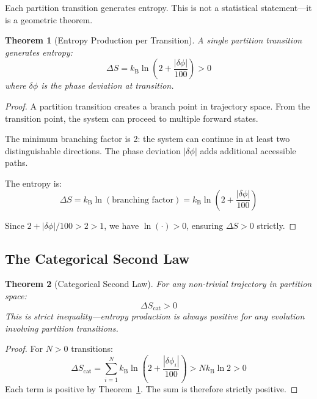 \documentclass[twocolumn,10pt,a4paper]{article}
\newtheorem{theorem}{Theorem}[section]
\theoremstyle{definition}
\theoremstyle{remark}
\newcommand{\kB}{k_{\mathrm{B}}}
\begin{document}
Each partition transition generates entropy. This is not a statistical statement---it is a geometric theorem.

\begin{theorem}[Entropy Production per Transition]
\label{thm:entropy_transition}
A single partition transition generates entropy:
\begin{equation}
    \Delta S = \kB \ln\left(2 + \frac{|\delta\phi|}{100}\right) > 0
\end{equation}
where $\delta\phi$ is the phase deviation at transition.
\end{theorem}

\begin{proof}
A partition transition creates a branch point in trajectory space. From the transition point, the system can proceed to multiple forward states.

The minimum branching factor is 2: the system can continue in at least two distinguishable directions. The phase deviation $|\delta\phi|$ adds additional accessible paths.

The entropy is:
\begin{equation}
    \Delta S = \kB \ln(\text{branching factor}) = \kB \ln\left(2 + \frac{|\delta\phi|}{100}\right)
\end{equation}

Since $2 + |\delta\phi|/100 > 2 > 1$, we have $\ln(\cdot) > 0$, ensuring $\Delta S > 0$ strictly.
\end{proof}

\subsection{The Categorical Second Law}

\begin{theorem}[Categorical Second Law]
\label{thm:second_law}
For any non-trivial trajectory in partition space:
\begin{equation}
    \Delta S_{\text{cat}} > 0
\end{equation}
This is strict inequality---entropy production is always positive for any evolution involving partition transitions.
\end{theorem}

\begin{proof}
For $N > 0$ transitions:
\begin{equation}
    \Delta S_{\text{cat}} = \sum_{i=1}^{N} \kB \ln\left(2 + \frac{|\delta\phi_i|}{100}\right) > N \kB \ln 2 > 0
\end{equation}
Each term is positive by Theorem~\ref{thm:entropy_transition}. The sum is therefore strictly positive.
\end{proof}
\end{document}
